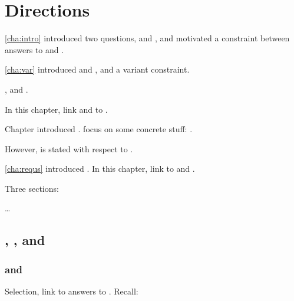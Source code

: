 \chapter{Directions}
\label{cha:binding}

\begin{note}
  \autoref{cha:intro} introduced two questions, \qWhy{} and \qHow{}, and motivated a constraint between answers to \qWhy{} and \qHow{}.

  \autoref{cha:var} introduced \qWhyV{} and \qHowV{}, and a variant constraint.

  \fc{}, and \requ{}.

  In this chapter, link  and  to \qWhyV{}.
\end{note}

\begin{note}
  Chapter introduced .
   focus on some concrete stuff: .

  However, \qWhyV{} is stated with respect to \ros{}.
\end{note}


\begin{note}
  \autoref{cha:requs} introduced .
  In this chapter, link  to \qWhyV{} and \issueConstraint{}.
\end{note}

\begin{note}
  Three sections:
  \begin{TOCEnum}
  \item
    \dots
  \end{TOCEnum}
\end{note}


\section{, \qWhyV{}, and \issueConstraint{}}
\label{sec:comining-ingredients}


\subsection{ and \qWhyV{}}

\begin{note}
  Selection, link  to answers to \qWhyV{}.
  Recall:

\end{note}

